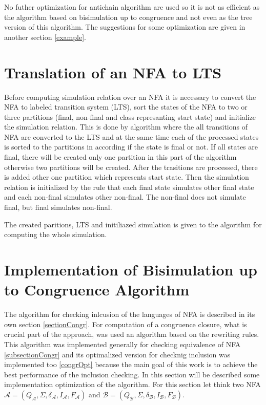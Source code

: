 No futher optimization for antichain algorithm are used so it is not as efficient as the algorithm based on bisimulation up to congruence and not even as the 
tree version of this algorithm. The suggestions for some optimization are given in another section \ref{example}.

\section{Translation of an NFA to LTS}
Before computing simulation relation over an NFA it is necessary to convert the NFA to labeled transition system (LTS), sort the states of the NFA to
two or three partitions (final, non-final and class represanting start state) and initialize the simulation relation. This is done by algorithm where 
the all transitions of NFA are converted to the LTS and at the same time each of the processed states is sorted to the partitions in according if
the state is final or not. If all states are final, there will be created only one partition in this part of the algorithm otherwise two partitions will
be created. After the trasitions are processed, there is added other one partition which represents start state. Then the simulation relation is initialized
by the rule that each final state simulates other final state and each non-final simulates other non-final. The non-final does not simulate final, but 
final simulates non-final.

The created paritions, LTS and initiliazed simulation is given to the algorithm for computing the whole simulation. 

\section{Implementation of Bisimulation up to Congruence Algorithm}
\label{sectionCongrImpl}
The algorithm for checking inlcusion of the languages of NFA is described in its own section \ref{sectionCongr}. For computation of a congruence closure, 
what is crucial part of the approach, was used an algorithm based on the rewriting rules. This algorithm was implemented generally for checking equivalence
of NFA \ref{subsectionCongr} and its optimalized version for checknig inclusion was implemented too \ref{congrOpt} 
because the main goal of this work is to achieve the best performance of the inclusion checking. In this section will be described some implementation
optimization of the algorithm. For this section let think two NFA $\mathcal{A}=(Q_\mathcal{A},\Sigma,\delta_\mathcal{A},I_\mathcal{A},F_\mathcal{A})$ and
$\mathcal{B}=(Q_\mathcal{B},\Sigma,\delta_\mathcal{B},I_\mathcal{B},F_\mathcal{B})$.


